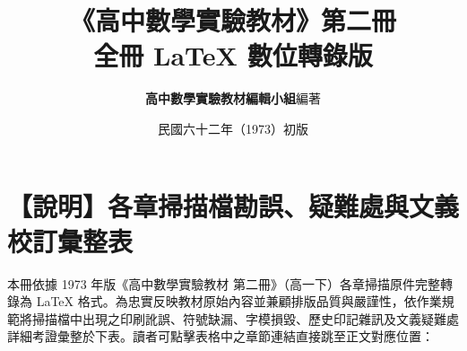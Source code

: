 \documentclass[a4paper,12pt,twoside]{article}
\title{\LARGE\textbf{《高中數學實驗教材》第二冊}\\[0.5em] \Large\textbf{全冊 \LaTeX{} 數位轉錄版}}
\author{\textbf{高中數學實驗教材編輯小組}\quad 編著}
\date{民國六十二年（1973）初版}
\begin{document}
\maketitle
\thispagestyle{empty}

\section*{【說明】各章掃描檔勘誤、疑難處與文義校訂彙整表}
\label{sec:master_errata_notes_b2}

本冊依據 1973 年版《高中數學實驗教材 第二冊》（高一下）各章掃描原件完整轉錄為 \LaTeX{} 格式。為忠實反映教材原始內容並兼顧排版品質與嚴謹性，依作業規範將掃描檔中出現之印刷訛誤、符號缺漏、字模損毀、歷史印記雜訊及文義疑難處詳細考證彙整於下表。讀者可點擊表格中之章節連結直接跳至正文對應位置：
\end{document}
